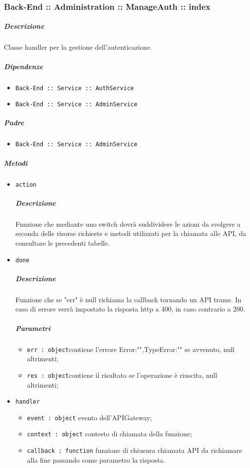 \documentclass[../ManualeSviluppatore_v2.0.0.tex]{subfiles}
\begin{document}
\subsubsection{Back-End :: Administration :: ManageAuth :: index}
\subparagraph{Descrizione} Classe handler per la gestione dell'autenticazione.
\subparagraph{Dipendenze}
\begin{itemize}
	\item \texttt{Back-End :: Service :: AuthService}
	\item	\texttt{Back-End :: Service :: AdminService}
\end{itemize}
\subparagraph{Padre}
\begin{itemize}
	\item	\texttt{Back-End :: Service :: AdminService}
\end{itemize}
\subparagraph{Metodi}
\begin{itemize}
	\item \texttt{action}
	      \subparagraph{Descrizione} Funzione che mediante uno switch dovrà suddividere le azioni da svolgere a seconda delle risorse richieste e metodi utilizzati per la chiamata alle API, da consultare le precedenti tabelle.
	\item \texttt{done}
	      \subparagraph{Descrizione} Funzione che se "err" è null richiama la callback tornando un API trame. In caso di errore verrà impostato la risposta http a 400, in caso contrario a 200.
	      \subparagraph{Parametri}
	      \begin{itemize}
	      	\item \texttt{err : object}contiene l'errore {Error:"",TypeError:""} se avvenuto, null altrimenti;
	      	\item \texttt{res : object}contiene il risultato se l'operazione è riuscita, null altrimenti;
	      \end{itemize}
	\item \texttt{handler}
	      \begin{itemize}
	      	\item \texttt{event : object} evento dell'APIGateway;
	      	\item \texttt{context : object} contesto di chiamata della funzione;
	      	\item \texttt{callback : function} funzione di chiusura chiamata API da richiamare alla fine passando come parametro la risposta.
	      \end{itemize}
\end{itemize}
\end{document}
